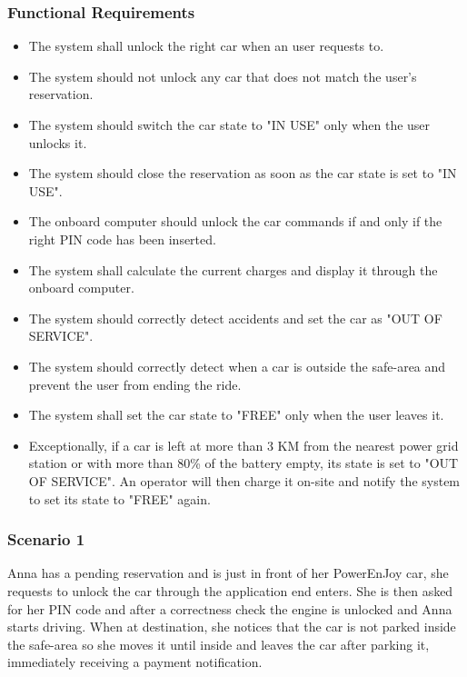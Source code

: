 \subsubsection{Functional Requirements}
\begin{itemize}
  \item The system shall unlock the right car when an user requests to.
  \item The system should not unlock any car that does not match the user's reservation.
  \item The system should switch the car state to "IN USE" only when the user unlocks it.
  \item The system should close the reservation as soon as the car state is set to "IN USE".
  \item The onboard computer should unlock the car commands if and only if the right PIN code has been inserted.
  \item The system shall calculate the current charges and display it through the onboard computer.
  \item The system should correctly detect accidents and set the car as "OUT OF SERVICE".
  \item The system should correctly detect when a car is outside the safe-area and prevent the user from ending the ride.
  \item The system shall set the car state to "FREE" only when the user leaves it.
  \item Exceptionally, if a car is left at more than 3 KM from the nearest power grid station or with more than 80\% of the battery empty, its state is set to "OUT OF SERVICE".  An operator will then charge it on-site and notify the system to set its state to "FREE" again. %
\end{itemize}


\subsubsection{Scenario 1}
Anna has a pending reservation and is just in front of her PowerEnJoy car, she requests to unlock the car through the application end enters. She is then asked for her PIN code and after a correctness check the engine is unlocked and Anna starts driving. When at destination, she notices that the car is not parked inside the safe-area so she moves it until inside and leaves the car after parking it, immediately receiving a payment notification.


